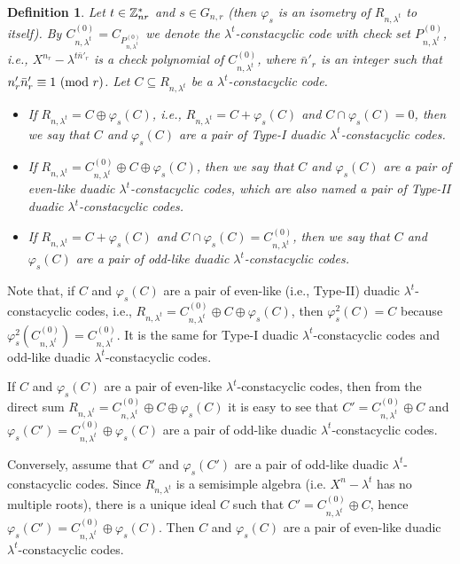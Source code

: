 \documentclass{article}
\newtheorem{Definition}[Theorem]{Definition}
\numberwithin{equation}{section}
\numberwithin{table}{section}
\def\Z{{\Bbb Z}}
\def\M{{\varphi}} \def\N{{\psi}} \def\m{{\mu}}
\begin{document}
\begin{Definition}\label{def duadic}\rm
Let $t\in\Z_{nr}^*$ and $s\in G_{n,r}$
(then $\M_s$ is an isometry of $R_{n,\lambda^t}$ to itself).
By $C_{n,\lambda^t}^{(0)}=C_{P_{n,\lambda^{t}}^{(0)}}$
we denote the $\lambda^t$-constacyclic code with check set
$P_{n,\lambda^{t}}^{(0)}$, i.e., $X^{n_r}-\lambda^{t\bar n'_r}$
is a check polynomial of $C_{n,\lambda^t}^{(0)}$,
where $\bar n'_r$ is an integer such that $n'_r\bar n'_r\equiv 1~({\rm mod}~r)$.
Let $C\subseteq R_{n,\lambda^t}$ be a $\lambda^t$-constacyclic code.
\begin{itemize}
\item[(i)]
If $R_{n,\lambda^t}= C\oplus \M_s(C)$, i.e.,
$R_{n,\lambda^t}= C+\M_s(C)$ and $C\cap\M_s(C)=0$,
then we say that $C$ and $\M_s(C)$ are a pair of
{\em Type-I duadic $\lambda^t$-constacyclic codes}.
\item[(ii)]
If $R_{n,\lambda^t}=C_{n,\lambda^t}^{(0)}\oplus C\oplus \M_s(C)$,
then we say that $C$ and $\M_s(C)$ are a pair of
{\em even-like duadic $\lambda^t$-constacyclic codes},
which are also named 
a pair of {\em Type-II} duadic $\lambda^t$-constacyclic codes.
\item[(iii)]
If $R_{n,\lambda^t}= C+\M_s(C)$
and $C\cap\M_s(C)=C_{n,\lambda^t}^{(0)}$,
then we say that $C$ and $\M_s(C)$ are a pair of
{\em odd-like duadic $\lambda^t$-constacyclic codes}.
\end{itemize}
\end{Definition}

Note that, if $C$ and $\M_s(C)$ are a pair of even-like (i.e., Type-II)
duadic $\lambda^t$-constacyclic codes,
i.e., $R_{n,\lambda^t}=C_{n,\lambda^t}^{(0)}\oplus C\oplus \M_s(C)$,
then $\M_s^2(C)=C$ because 
$\M_s^2(C_{n,\lambda^t}^{(0)})=C_{n,\lambda^t}^{(0)}$.
It is the same for Type-I duadic $\lambda^t$-constacyclic codes
and odd-like duadic $\lambda^t$-constacyclic codes.


If $C$ and $\M_{s}(C)$ are a pair of even-like 
$\lambda^t$-constacyclic codes, then from the direct sum 
$R_{n,\lambda^t}= C_{n,\lambda^t}^{(0)}\oplus C\oplus \M_{s}(C)$ 
it is easy to see that $C'=C_{n,\lambda^t}^{(0)}\oplus C$ and
$\M_s(C')= C_{n,\lambda^t}^{(0)}\oplus \M_s(C)$ 
are a pair of odd-like duadic $\lambda^t$-constacyclic codes.
 
Conversely, assume that $C'$ and $\M_s(C')$ are a pair 
of odd-like duadic $\lambda^t$-constacyclic codes. 
Since $R_{n,\lambda^t}$ is a semisimple algebra
(i.e. $X^n-\lambda^t$ has no multiple roots), 
there is a unique ideal $C$ such that $C'=C_{n,\lambda^t}^{(0)}\oplus C$, 
hence $\M_s(C')=C_{n,\lambda^t}^{(0)}\oplus \M_s(C)$.
Then $C$ and $\M_s(C)$ are a pair of 
even-like duadic $\lambda^t$-constacyclic codes.
\end{document}
